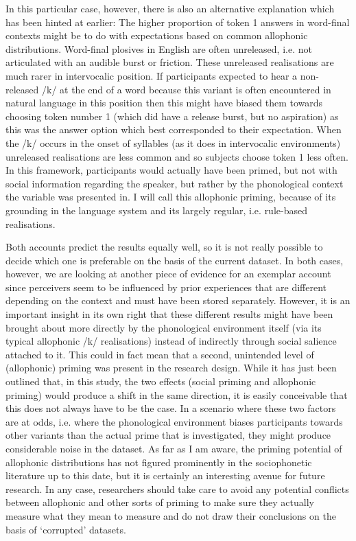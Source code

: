 In this particular case, however, there is also an alternative explanation which has been hinted at earlier: The higher proportion of token 1 answers in word-final contexts might be to do with expectations based on common allophonic distributions.
Word-final plosives in English are often unreleased, i.e. not articulated with an audible burst or friction.
These unreleased realisations are much rarer in intervocalic position.
If participants expected to hear a non-released /k/ at the end of a word because this variant is often encountered in natural language in this position then this might have biased them towards choosing token number 1 (which did have a release burst, but no aspiration) as this was the answer option which best corresponded to their expectation.
When the /k/ occurs in the onset of syllables (as it does in intervocalic environments) unreleased realisations are less common and so subjects choose token 1 less often.
In this framework, participants would actually have been primed, but not with social information regarding the speaker, but rather by the phonological context the variable was presented in.
I will call this allophonic priming, because of its grounding in the language system and its largely regular, i.e. rule-based realisations.

Both accounts predict the results equally well, so it is not really possible to decide which one is preferable on the basis of the current dataset.
In both cases, however, we are looking at another piece of evidence for an exemplar account since perceivers seem to be influenced by prior experiences that are different depending on the context and must have been stored separately.
However, it is an important insight in its own right that these different results might have been brought about more directly by the phonological environment itself (via its typical allophonic /k/ realisations) instead of indirectly through social salience attached to it.
This could in fact mean that a second, unintended level of (allophonic) priming was present in the research design.
While it has just been outlined that, in this study, the two effects (social priming and allophonic priming) would produce a shift in the same direction, it is easily conceivable that this does not always have to be the case.
In a scenario where these two factors are at odds, i.e. where the phonological environment biases participants towards other variants than the actual prime that is investigated, they might produce considerable noise in the dataset.
As far as I am aware, the priming potential of allophonic distributions has not figured prominently in the sociophonetic literature up to this date, but it is certainly an interesting avenue for future research.
In any case, researchers should take care to avoid any potential conflicts between allophonic and other sorts of priming to make sure they actually measure what they mean to measure and do not draw their conclusions on the basis of `corrupted' datasets.

